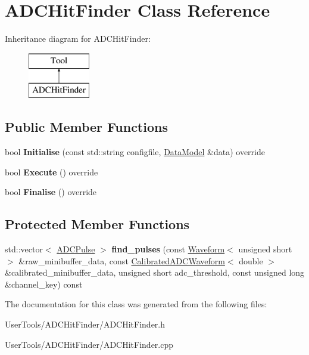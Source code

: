 \hypertarget{classADCHitFinder}{\section{A\-D\-C\-Hit\-Finder Class Reference}
\label{classADCHitFinder}
}
Inheritance diagram for A\-D\-C\-Hit\-Finder\-:\begin{figure}[H]
\begin{center}
\leavevmode
\includegraphics[height=2.000000cm]{classADCHitFinder}
\end{center}
\end{figure}
\subsection*{Public Member Functions}
\begin{DoxyCompactItemize}
\item 
\hypertarget{classADCHitFinder_a944ec97d4451bd6da825a51ddd2481a4}{bool {\bfseries Initialise} (const std\-::string configfile, \hyperlink{classDataModel}{Data\-Model} \&data) override}\label{classADCHitFinder_a944ec97d4451bd6da825a51ddd2481a4}

\item 
\hypertarget{classADCHitFinder_a17e0a0b2622a32902025ec1e2a498a42}{bool {\bfseries Execute} () override}\label{classADCHitFinder_a17e0a0b2622a32902025ec1e2a498a42}

\item 
\hypertarget{classADCHitFinder_a7bc2963aac26cf6dbb5e2be2ed034f60}{bool {\bfseries Finalise} () override}\label{classADCHitFinder_a7bc2963aac26cf6dbb5e2be2ed034f60}

\end{DoxyCompactItemize}
\subsection*{Protected Member Functions}
\begin{DoxyCompactItemize}
\item 
\hypertarget{classADCHitFinder_a1543f5cfc28798facf7dc1bd67697171}{std\-::vector$<$ \hyperlink{classADCPulse}{A\-D\-C\-Pulse} $>$ {\bfseries find\-\_\-pulses} (const \hyperlink{classWaveform}{Waveform}$<$ unsigned short $>$ \&raw\-\_\-minibuffer\-\_\-data, const \hyperlink{classCalibratedADCWaveform}{Calibrated\-A\-D\-C\-Waveform}$<$ double $>$ \&calibrated\-\_\-minibuffer\-\_\-data, unsigned short adc\-\_\-threshold, const unsigned long \&channel\-\_\-key) const }\label{classADCHitFinder_a1543f5cfc28798facf7dc1bd67697171}

\end{DoxyCompactItemize}


The documentation for this class was generated from the following files\-:\begin{DoxyCompactItemize}
\item 
User\-Tools/\-A\-D\-C\-Hit\-Finder/A\-D\-C\-Hit\-Finder.\-h\item 
User\-Tools/\-A\-D\-C\-Hit\-Finder/A\-D\-C\-Hit\-Finder.\-cpp\end{DoxyCompactItemize}
